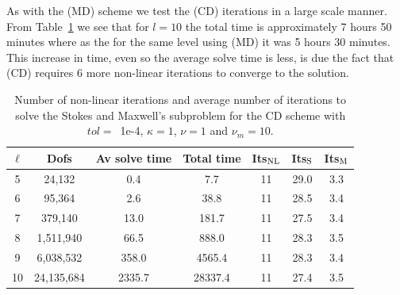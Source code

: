 As with the (MD) scheme we test the (CD) iterations in a large scale manner. From Table~\ref{tab:CD_large_scale} we see that for $l=10$ the total time is approximately 7 hours 50 minutes where as the for the same level using (MD) it was 5 hours 30 minutes. This increase in time, even so the average solve time is less, is due the  fact that (CD) requires 6 more non-linear iterations to converge to the solution.
\begin{table}[h!] \small
\begin{center}
\begin{tabular}{ccccccc}
\hline
 $\ell$ &      Dofs &  Av solve time &  Total time & Its$_{\rm NL}$ &     Its$_{\rm S}$ &    Its$_{\rm M}$ \\
\hline
 5 &    24,132 &       0.4 &           7.7 &                 11 &        29.0 &        3.3 \\
 6 &    95,364 &       2.6 &          38.8 &                 11 &        28.5 &        3.4 \\
 7 &   379,140 &      13.0 &         181.7 &                 11 &        27.5 &        3.4 \\
 8 &  1,511,940 &      66.5 &         888.0 &                 11 &        28.3 &        3.5 \\
 9 &  6,038,532 &     358.0 &        4565.4 &                 11 &        28.3 &        3.4 \\
 10 &  24,135,684 &    2335.7 &       28337.4 &                 11 &        27.4 &        3.5 \\
\hline
\end{tabular}
\caption{Number of non-linear iterations and average number of iterations to solve the Stokes and Maxwell's subproblem for the CD scheme with $tol=$~1e-4, $\kappa = 1$, $\nu = 1$ and $\nu_m = 10$.}
\label{tab:CD_large_scale}
\end{center}
\end{table}


